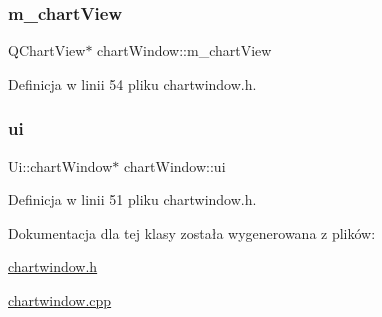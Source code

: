 \subsubsection{\texorpdfstring{m\+\_\+chart\+View}{m\_chartView}}
{\footnotesize\ttfamily Q\+Chart\+View$\ast$ chart\+Window\+::m\+\_\+chart\+View\hspace{0.3cm}{\ttfamily [private]}}



Definicja w linii 54 pliku chartwindow.\+h.

\mbox{\label{classchart_window_a0efd4a0d018eaa19c813c9d69522c75e}} 
\subsubsection{\texorpdfstring{ui}{ui}}
{\footnotesize\ttfamily Ui\+::chart\+Window$\ast$ chart\+Window\+::ui\hspace{0.3cm}{\ttfamily [private]}}



Definicja w linii 51 pliku chartwindow.\+h.



Dokumentacja dla tej klasy została wygenerowana z plików\+:\begin{DoxyCompactItemize}
\item 
\hyperlink{chartwindow_8h}{chartwindow.\+h}\item 
\hyperlink{chartwindow_8cpp}{chartwindow.\+cpp}\end{DoxyCompactItemize}
